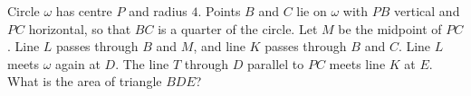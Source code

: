 Circle $\omega$ has centre $P$ and radius $4$. Points $B$ and $C$ lie on $\omega$ with $PB$ vertical and $PC$ horizontal, so that $BC$ is a quarter of the circle. Let $M$ be the midpoint of $PC$. Line $L$ passes through $B$ and $M$, and line $K$ passes through $B$ and $C$. Line $L$ meets $\omega$ again at $D$. The line $T$ through $D$ parallel to $PC$ meets line $K$ at $E$. What is the area of triangle $BDE$?
